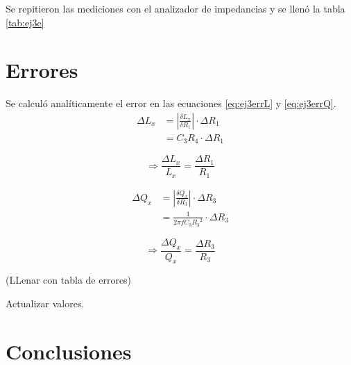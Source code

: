     Se repitieron las mediciones con el analizador de impedancias y se llenó la tabla \ref{tab:ej3e}
    

    \section{Errores}
    Se calculó analíticamente el error en las ecuaciones \ref{eq:ej3errL} y \ref{eq:ej3errQ}.
    \begin{equation*}
        \begin{split}
            \Delta L_x &=\left| \frac{\delta L_x}{\delta R_1} \right| \cdot \Delta R_1\\
                       &= C_3 R_4 \cdot \Delta R_1
        \end{split}
    \end{equation*}

    \begin{equation}
        \Rightarrow\frac{\Delta L_x}{L_x} = \frac{\Delta R_1}{R_1}
        \label{eq:ej3errL}
    \end{equation}

    \begin{equation*}
        \begin{split}
            \Delta Q_x &= \left| \frac{\delta Q_x}{\delta R_3} \right| \cdot \Delta R_3\\
                       &= \frac{1}{ 2 \pi f C_3 {R_3}^2} \cdot \Delta R_3
        \end{split}
    \end{equation*}

    \begin{equation}
        \Rightarrow\frac{\Delta Q_x}{Q_x} = \frac{\Delta R_3}{R_3}
        \label{eq:ej3errQ}
    \end{equation}

    (LLenar con tabla de errores)

    Actualizar valores.

    \section{Conclusiones}